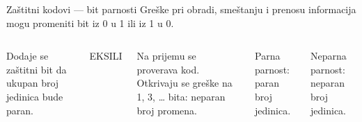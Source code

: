 \begin{frame}[label=06-s022]{Zaštitni kodovi — bit parnosti}
Greške pri obradi, smeštanju i prenosu informacija mogu promeniti bit iz 0 u 1 ili iz 1 u 0.
\medskip
\begin{columns}[c,onlytextwidth]
\centering\fontsize{10}{12}\selectfont
\renewcommand{\arraystretch}{1.22}\setlength{\tabcolsep}{5pt}
Dodaje se zaštitni bit da ukupan broj jedinica bude paran.\par\medskip
\centering\alert{EKSILI}\par\medskip\raggedright
Na prijemu se proverava kod. Otkrivaju se greške na 1, 3, … bita: neparan broj promena.\par\medskip
Parna parnost: paran broj jedinica.\par\smallskip
Neparna parnost: neparan broj jedinica.
\end{columns}
\end{frame}

